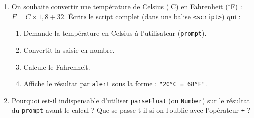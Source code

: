 \documentclass[11pt]{article}
\begin{document}
\begin{exercice}
\begin{enumerate}
    \item On souhaite convertir une température de Celsius ($^\circ$C) en Fahrenheit ($^\circ$F) : $F = C \times 1,8 + 32$.
    Écrire le script complet (dans une balise \texttt{<script>}) qui :
    \begin{enumerate}
        \item Demande la température en Celsius à l'utilisateur (\texttt{prompt}).
        \item Convertit la saisie en nombre.
        \item Calcule le Fahrenheit.
        \item Affiche le résultat par \texttt{alert} sous la forme : \texttt{"20°C = 68°F"}.
    \end{enumerate}
    \item Pourquoi est-il indispensable d'utiliser \texttt{parseFloat} (ou \texttt{Number}) sur le résultat du \texttt{prompt} avant le calcul ? Que se passe-t-il si on l'oublie avec l'opérateur \texttt{+} ?
\end{enumerate}
\end{exercice}
\end{document}
